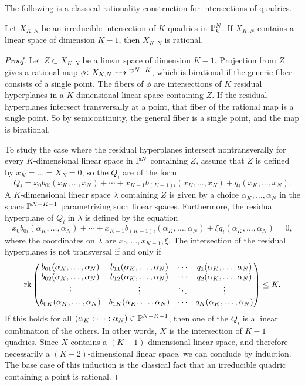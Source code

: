 The following is a classical rationality construction for intersections of quadrics.
\begin{proposition}
	\label{prop:RationalFromLinearSpace}
	Let $X_{K,N}$ be an irreducible intersection of $K$ quadrics in $\P_k^N$. If $X_{K,N}$ contains a linear space of dimension $K-1$, then $X_{K,N}$ is rational.
\end{proposition}
\begin{proof}
	Let $Z \subset X_{K,N}$ be a linear space of dimension $K-1$. Projection from $Z$ gives a rational map $\phi \from X_{K,N} \dashrightarrow \P^{N-K}$, which is birational if the generic fiber consists of a single point. The fibers of $\phi$ are intersections of $K$ residual hyperplanes in a $K$-dimensional linear space containing $Z$. If the residual hyperplanes intersect transversally at a point, that fiber of the rational map is a single point. So by semicontinuity, the general fiber is a single point, and the map is birational.

To study the case where the residual hyperplanes intersect nontransverally for every $K$-dimensional linear space in $\P^N$ containing $Z$, assume that $Z$ is defined by $x_{K} = \dots = X_N = 0$, so the $Q_i$ are of the form
\[Q_i = x_0 b_{0i}(x_K,\dots,x_N) + \cdots + x_{K-1}b_{(K-1)i}(x_K,\dots,x_N) + q_i(x_K,\dots,x_N). \]
A $K$-dimensional linear space $\lambda$ containing $Z$ is given by a choice $\alpha_{K},\dots,\alpha_N$ in the space $\P^{N-K-1}$ parametrizing such linear spaces. Furthermore, the residual hyperplane of $Q_i$ in $\lambda$ is defined by the equation
\[x_0 b_{0i}(\alpha_K,\dots,\alpha_N) + \cdots + x_{K-1}b_{(K-1)i}(\alpha_K,\dots,\alpha_N) + \xi q_i(\alpha_K,\dots,\alpha_N) = 0, \]
where the coordinates on $\lambda$ are $x_0,\dots,x_{K-1},\xi$. The intersection of the residual hyperplanes is not transversal if and only if
\begin{equation*}
  \rk
  \begin{pmatrix}
    b_{01}(\alpha_K,\dots,\alpha_N) & b_{11}(\alpha_K,\dots,\alpha_N) & \cdots & q_1(\alpha_K,\dots,\alpha_N) \\
        b_{02}(\alpha_K,\dots,\alpha_N) & b_{12}(\alpha_K,\dots,\alpha_N) & \cdots & q_2(\alpha_K,\dots,\alpha_N) \\
        \vdots & \vdots & \ddots & \vdots \\
    b_{0K}(\alpha_K,\dots,\alpha_N) & b_{1K}(\alpha_K,\dots,\alpha_N) & \cdots & q_K(\alpha_K,\dots,\alpha_N) \\
  \end{pmatrix}
\leq K.
\end{equation*}
If this holds for all $(\alpha_K:\dots:\alpha_N) \in \P^{N-K-1}$, then one of the $Q_i$ is a linear combination of the others. In other words, $X$ is the intersection of $K-1$ quadrics. Since $X$ contains a $(K-1)$-dimensional linear space, and therefore necessarily a $(K-2)$-dimensional linear space, we can conclude by induction. The base case of this induction is the classical fact that an irreducible quadric containing a point is rational.
\end{proof}

